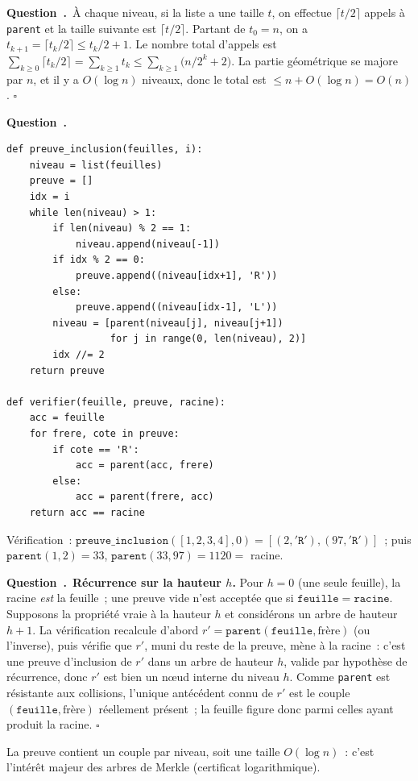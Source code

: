 \documentclass[11pt,a4paper]{article}
\newcounter{qcnt}
\newcommand{\Q}{\medskip\par\stepcounter{qcnt}\noindent\textbf{Question~\theqcnt.}~}
\newcommand{\code}[1]{\lstinline!#1!}
\begin{document}
\Q À chaque niveau, si la liste a une taille $t$, on effectue $\lceil t/2\rceil$ appels à
\code{parent} et la taille suivante est $\lceil t/2\rceil$. Partant de $t_0 = n$, on a
$t_{k+1} = \lceil t_k/2\rceil \le t_k/2 + 1$. Le nombre total d'appels est
$\sum_{k\ge 0} \lceil t_k/2\rceil = \sum_{k\ge 1} t_k \le \sum_{k\ge 1}\bigl(n/2^{k} + 2\bigr)$.
La partie géométrique se majore par $n$, et il y a $O(\log n)$ niveaux, donc le total est
$\le n + O(\log n) = O(n)$. $\square$

\Q
\begin{lstlisting}
def preuve_inclusion(feuilles, i):
    niveau = list(feuilles)
    preuve = []
    idx = i
    while len(niveau) > 1:
        if len(niveau) % 2 == 1:
            niveau.append(niveau[-1])
        if idx % 2 == 0:
            preuve.append((niveau[idx+1], 'R'))
        else:
            preuve.append((niveau[idx-1], 'L'))
        niveau = [parent(niveau[j], niveau[j+1])
                  for j in range(0, len(niveau), 2)]
        idx //= 2
    return preuve

def verifier(feuille, preuve, racine):
    acc = feuille
    for frere, cote in preuve:
        if cote == 'R':
            acc = parent(acc, frere)
        else:
            acc = parent(frere, acc)
    return acc == racine
\end{lstlisting}
Vérification~: $\mathtt{preuve\_inclusion}([1,2,3,4],0) = [(2,\mathtt{'R'}),(97,\mathtt{'R'})]$~; puis
$\mathtt{parent}(1,2)=33$, $\mathtt{parent}(33,97)=1120=$ racine.

\Q \textbf{Récurrence sur la hauteur $h$.} Pour $h=0$ (une seule feuille), la racine \emph{est}
la feuille~; une preuve vide n'est acceptée que si $\mathtt{feuille} = \mathtt{racine}$. Supposons la
propriété vraie à la hauteur $h$ et considérons un arbre de hauteur $h+1$. La vérification
recalcule d'abord $r' = \mathtt{parent}(\mathtt{feuille}, \text{frère})$ (ou l'inverse), puis vérifie
que $r'$, muni du reste de la preuve, mène à la racine~: c'est une preuve d'inclusion de $r'$
dans un arbre de hauteur $h$, valide par hypothèse de récurrence, donc $r'$ est bien un n\oe ud
interne du niveau $h$. Comme \code{parent} est résistante aux collisions, l'unique antécédent
connu de $r'$ est le couple $(\mathtt{feuille}, \text{frère})$ réellement présent~; la feuille figure
donc parmi celles ayant produit la racine. $\square$

\noindent La preuve contient un couple par niveau, soit une taille $O(\log n)$~: c'est
l'intérêt majeur des arbres de Merkle (certificat logarithmique).
\end{document}
